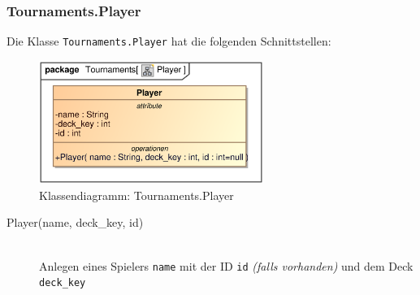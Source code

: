 \subsubsection{Tournaments.Player}
Die Klasse \verb|Tournaments.Player| hat die folgenden Schnittstellen:
\begin{figure}[H]
    \myfloatalign
    \includegraphics[width=0.65\textwidth]{gfx/MtGDeepAnalysis/Player.eps}
    \caption{Klassendiagramm: Tournaments.Player}
    \label{fig:class:Tournaments.Player}
\end{figure}
\begin{description}
    \item[Player(name, deck\_key, id)] \hfill \\
    Anlegen eines Spielers \verb|name| mit der ID \verb|id| \emph{(falls vorhanden)} und dem Deck \verb|deck_key|
\end{description}

